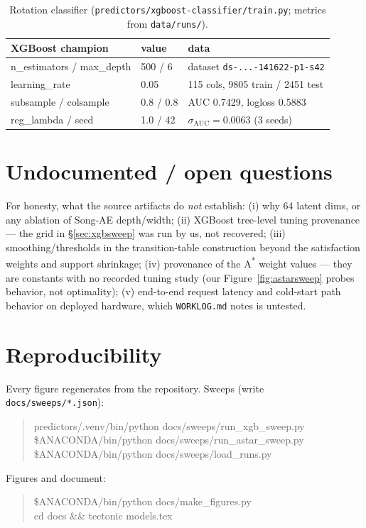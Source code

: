 \documentclass[11pt]{article}
\newcommand{\file}[1]{\texttt{\small #1}}
\newcommand{\code}[1]{\texttt{\small #1}}
\begin{document}
\begin{table}[H]\centering\small
\begin{tabular}{@{}lll@{}}
\toprule
XGBoost champion & value & data \\
\midrule
n\_estimators / max\_depth & 500 / 6 & dataset \code{ds-...-141622-p1-s42} \\
learning\_rate & 0.05 & 115 cols, 9805 train / 2451 test \\
subsample / colsample & 0.8 / 0.8 & AUC 0.7429, logloss 0.5883 \\
reg\_lambda / seed & 1.0 / 42 & $\sigma_{\text{AUC}}=0.0063$ (3 seeds) \\
\bottomrule
\end{tabular}
\caption{Rotation classifier (\file{predictors/xgboost-classifier/train.py}; metrics from
\file{data/runs/}).}
\end{table}

\section{Undocumented / open questions}
\label{app:open}

For honesty, what the source artifacts do \emph{not} establish: (i) why 64 latent dims, or any
ablation of Song-AE depth/width; (ii) XGBoost tree-level tuning provenance --- the grid in
\S\ref{sec:xgbsweep} was run by us, not recovered; (iii) smoothing/thresholds in the transition-table
construction beyond the satisfaction weights and support shrinkage; (iv) provenance of the
A\textsuperscript{*} weight values --- they are constants with no recorded tuning study (our
Figure~\ref{fig:astarsweep} probes behavior, not optimality); (v) end-to-end request latency and
cold-start path behavior on deployed hardware, which \file{WORKLOG.md} notes is untested.

\section{Reproducibility}
\label{app:repro}

Every figure regenerates from the repository. Sweeps (write \file{docs/sweeps/*.json}):
\begin{quote}\small\ttfamily
predictors/.venv/bin/python docs/sweeps/run\_xgb\_sweep.py\\
\$ANACONDA/bin/python docs/sweeps/run\_astar\_sweep.py\\
\$ANACONDA/bin/python docs/sweeps/load\_runs.py
\end{quote}
Figures and document:
\begin{quote}\small\ttfamily
\$ANACONDA/bin/python docs/make\_figures.py\\
cd docs \&\& tectonic models.tex
\end{quote}
\end{document}
